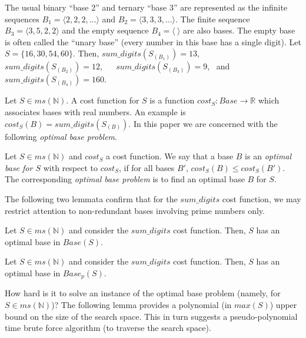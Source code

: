 \documentclass[envcountsame]{llncs}
\newcommand\tuple[1]{\langle #1 \rangle}
\newcommand{\Base}{\mathit{Base}}
\newcommand{\intMultiSet}{\mathit{ms(\mathbb{N})}}
\newcommand{\sumDigits}{\mathit{sum\_digits}}
\newcommand{\cost}{\mathit{cost}}
\begin{document}
\begin{example}
  The usual binary ``base 2'' and ternary ``base 3'' are represented
  as the infinite sequences $B_1=\tuple{2,2,2,\ldots}$ and
  $B_2=\tuple{3,3,3,\ldots}$. The finite sequence
  $B_3=\tuple{3,5,2,2}$ and the empty sequence $B_4=\tuple{~}$ are
  also bases. The empty base is often called the ``unary base''
  (every number in this base has a single digit).  
Let $S = \{16,30,54,60\}$.  Then, 
  $\sumDigits(S_{(B_1)})=13$,~~
  $\sumDigits(S_{(B_2)})=12$, ~~
  $\sumDigits(S_{(B_3)})=9$, ~and
  $\sumDigits(S_{(B_4)})=160$.
\end{example}

Let $S\in\intMultiSet$. A cost function for $S$ is a function
$\cost_S:\Base\rightarrow\mathbb{R}$ which associates bases with real
numbers. An example is $\cost_S(B)=\sumDigits(S_{(B)})$.
In this paper we are concerned with the following \emph{optimal base
problem}. 

\begin{definition}
  Let $S \in \intMultiSet$ and $\cost_S$ a cost function.  We say that
  a base $B$ is an \emph{optimal base for $S$} with respect to
  $\cost_S$, if for all bases $B'$, $\cost_S(B) \leq \cost_S(B')$.
  The corresponding \emph{optimal base problem} is to find an optimal
  base $B$ for $S$.
\end{definition}




The following two lemmata confirm that for the $\sumDigits$ cost
function, we may restrict attention to non-redundant bases involving
prime numbers only.

\begin{lemma}
\label{l1}
   Let $S \in \intMultiSet$ and consider the $\sumDigits$ cost
   function. Then, $S$ has an optimal base in $\Base(S)$.
\end{lemma}

\begin{lemma}
\label{lem:primes}
   Let $S \in \intMultiSet$ and consider the $\sumDigits$ cost
   function. Then, $S$ has an optimal base in $\Base_p(S)$.
\end{lemma}


How hard is it to solve an instance of the optimal base problem
(namely, for $S\in\intMultiSet$)? The following lemma provides a
polynomial (in $max(S)$) upper bound on the size of the search
space. This in turn suggests a pseudo-polynomial time brute force
algorithm (to traverse the search space).
\end{document}
